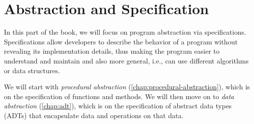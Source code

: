\documentclass[oneside,11pt,dvipsnames]{book}
\newcommand{\code}[1]{\texttt{#1}}
\begin{document}



    







\part{Abstraction and Specification}

In this part of the book, we will focus on program abstraction via specifications. Specifications allow developers to describe the behavior of a program without revealing its implementation details, thus making the program easier to understand and maintain and also more general, i.e., can use different algorithms or data structures.

We will start with \emph{procedural abstraction} (\autoref{chap:procedural-abstraction}), which is on the specification of functions and methods. We will then move on to \emph{data abstraction} (\autoref{chap:adt}),  which is on the specification of abstract data types (ADTs) that encapsulate data and operations on that data.
\end{document}
